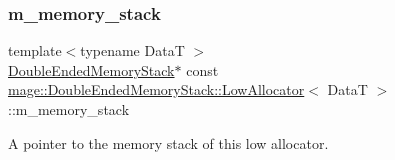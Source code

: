 \subsubsection{\texorpdfstring{m\+\_\+memory\+\_\+stack}{m\_memory\_stack}}
{\footnotesize\ttfamily template$<$typename DataT $>$ \\
\hyperlink{classmage_1_1_double_ended_memory_stack}{Double\+Ended\+Memory\+Stack}$\ast$ const \hyperlink{structmage_1_1_double_ended_memory_stack_1_1_low_allocator}{mage\+::\+Double\+Ended\+Memory\+Stack\+::\+Low\+Allocator}$<$ DataT $>$\+::m\+\_\+memory\+\_\+stack\hspace{0.3cm}{\ttfamily [private]}}

A pointer to the memory stack of this low allocator. 
